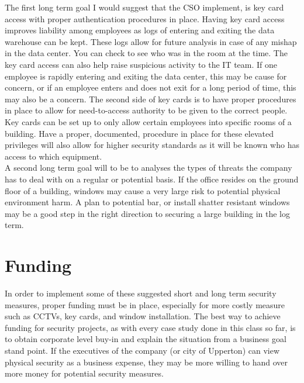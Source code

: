 \documentclass[paper=a4, fontsize=11pt]{scrartcl} %
\numberwithin{equation}{section} %
\numberwithin{figure}{section} %
\numberwithin{table}{section} %
\begin{document}
The first long term goal I would suggest that the CSO implement, is key card access with proper
authentication procedures in place. Having key card access improves liability among employees
as logs of entering and exiting the data warehouse can be kept. These logs allow for future analysis
in case of any mishap in the data center. You can check to see who was in the room at the time.
The key card access can also help raise suspicious activity to the IT team. If one employee
is rapidly entering and exiting the data center, this may be cause for concern, or if an employee
enters and does not exit for a long period of time, this may also be a concern. The second side
of key cards is to have proper procedures in place to allow for need-to-access authority to be
given to the correct people. Key cards can be set up to only allow certain employees into specific
rooms of a building. Have a proper, documented, procedure in place for these elevated privileges will also
allow for higher security standards as it will be known who has access to which equipment.\\

A second long term goal will to be to analyses the types of threats the company has to deal with
on a regular or potential basis. If the office resides on the ground floor of a building, windows
may cause a very large risk to potential physical environment harm. A plan to potential bar, or
install shatter resistant windows may be a good step in the right direction to securing a large 
building in the log term.

\section {Funding}

In order to implement some of these suggested short and long term security measures, proper
funding must be in place, especially for more costly measure such as CCTVs, key cards, and 
window installation. The best way to achieve funding for security projects, as with every case
study done in this class so far, is to obtain corporate level buy-in and explain the situation
from a business goal stand point. If the executives of the company (or city of Upperton) can
view physical security as a business expense, they may be more willing to hand over more money
for potential security measures.\\
\end{document}

